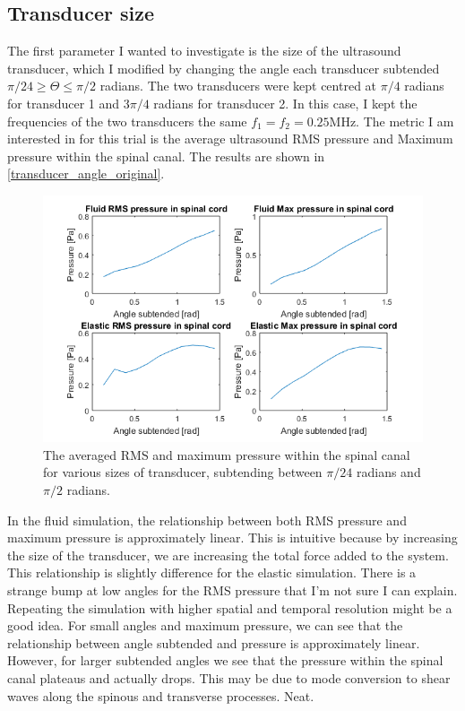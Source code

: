 \documentclass[10pt,a4paper]{article}
\begin{document}
\subsection*{Transducer size}

The first parameter I wanted to investigate is the size of the ultrasound transducer, which I modified by changing the angle each transducer subtended  $\pi/24 \geq \Theta \leq \pi/2$ radians. The two transducers were kept centred at $\pi/4$ radians for transducer 1 and $3\pi/4$ radians for transducer 2. In this case, I kept the frequencies of the two transducers the same $f_1 = f_2 = 0.25$MHz. The metric I am interested in for this trial is the average ultrasound RMS pressure and Maximum pressure within the spinal canal. The results are shown in \autoref{transducer_angle_original}.

\begin{figure}[H]
\includegraphics[scale=0.8]{transducer_angle_original}
\caption{The averaged RMS and maximum pressure within the spinal canal for various sizes of transducer, subtending between $\pi/24$ radians and $\pi/2$ radians.}
\end{figure}

In the fluid simulation, the relationship between both RMS pressure and maximum pressure is approximately linear. This is intuitive because by increasing the size of the transducer, we are increasing the total force added to the system. This relationship is slightly difference for the elastic simulation. There is a strange bump at low angles for the RMS pressure that I'm not sure I can explain. Repeating the simulation with higher spatial and temporal resolution might be a good idea. For small angles and maximum pressure, we can see that the relationship between angle subtended and pressure is approximately linear. However, for larger subtended angles we see that the pressure within the spinal canal plateaus and actually drops. This may be due to mode conversion to shear waves along the spinous and transverse processes. Neat. 
\end{document}
